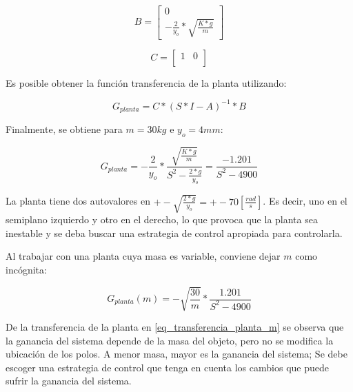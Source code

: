 \begin{equation}
	B=\begin{bmatrix}
		0\\
		-\frac{2}{y_{o}}*\sqrt{\frac{K*g}{m}}
	\end{bmatrix}
\end{equation}

\begin{equation}
	C=\begin{bmatrix}
		1 & 0\\
	\end{bmatrix}
\end{equation}

\noindent Es posible obtener la función transferencia de la planta utilizando:

\begin{equation}\label{eq_transferencia_planta}
	G_{planta}=C*(S*I-A)^{-1}*B
\end{equation}

\noindent Finalmente, se obtiene para $m=30kg$ e $y_{o}=4mm$:

\begin{equation}
	G_{planta}=-\frac{2}{y_{o}}*\frac{\sqrt{\frac{K*g}{m}}}{S^2-\frac{2*g}{y_{o}}}=\frac{-1.201}{S^{2}-4900}
\end{equation}

\noindent La planta tiene dos autovalores en $+-\sqrt{\frac{2*g}{y_{o}}}=+-70[\frac{rad}{s}]$. Es decir, uno en el semiplano izquierdo y otro en el derecho, lo que provoca que la planta sea inestable y se deba buscar una estrategia de control apropiada para controlarla.

\noindent Al trabajar con una planta cuya masa es variable, conviene dejar $m$ como incógnita:

\begin{equation} \label{eq_transferencia_planta_m}
		G_{planta}(m)=-\sqrt{\frac{30}{m}}*\frac{1.201}{S^{2}-4900}
\end{equation}

\noindent De la transferencia de la planta en \ref{eq_transferencia_planta_m} se observa que la ganancia del sistema depende de la masa del objeto, pero no se modifica la ubicación de los polos. A menor masa, mayor es la ganancia del sistema; Se debe escoger una estrategia de control que tenga en cuenta los cambios que puede sufrir la ganancia del sistema.
